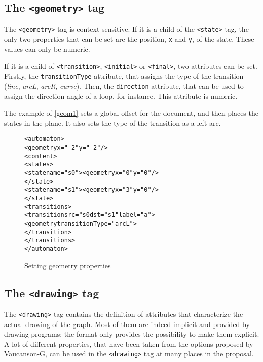 \documentclass[a4paper]{article}
\newcommand{\xtag}[1]{\texttt{<#1>}}
\newcommand{\xattr}[1]{\texttt{#1}}
\def\statetag{\xtag{state}}
\def\dstname{\xattr{dst}}
\def\srcname{\xattr{src}}
\def\transitiontag{\xtag{transition}}
\def\finaltag{\xtag{final}}
\def\initialtag{\xtag{initial}}
\def\geometrytag{\xtag{geometry}}
\def\drawingtag{\xtag{drawing}}
\begin{document}
\subsection{The \geometrytag{} tag}

The \geometrytag{} tag is context sensitive. If it is a child of the
\statetag{} tag, the only two properties that can be set are the
position, \verb|x| and \verb|y|, of the state. These values can only
be numeric.

If it is a child of \transitiontag{}, \initialtag{} or \finaltag{},
two attributes can be set. Firstly, the \xattr{transitionType}
attribute, that assigns the type of the transition (\textit{line},
\textit{arcL}, \textit{arcR}, \textit{curve}). Then, the
\xattr{direction} attribute, that can be used to assign the direction
angle of a loop, for instance. This attribute is numeric.

The example of \autoref{geom1} sets a global offset for the document,
and then places the states in the plane.  It also sets the type of the
transition as a left arc.

\begin{figure}[ht]
  \small
  \begin{center}
\begin{alltt}
<automaton>
  <geometry x="-2" y="-2"/>
  <content>
     <states>
        <state name="s0"><geometry x="0" y="0"/>
        </state>
        <state name="s1"><geometry x="3" y="0"/>
        </state>
     <transitions>
        <transition \srcname{}="s0 \dstname{}="s1" label="a">
          <geometry transitionType="arcL">
        </transition>
     </transitions>
</automaton>
\end{alltt}

\caption{Setting geometry properties}
\label{geom1}
  \end{center}
\end{figure}


\subsection{The \drawingtag{} tag}

The \drawingtag{} tag contains the definition of attributes that
characterize the actual drawing of the graph.  Most of them are indeed
implicit and provided by drawing programs; the format only provides
the possibility to make them explicit.  A lot of different properties,
that have been taken from the options proposed by Vaucanson-G, can be
used in the \drawingtag{} tag at many places in the proposal.
\end{document}
